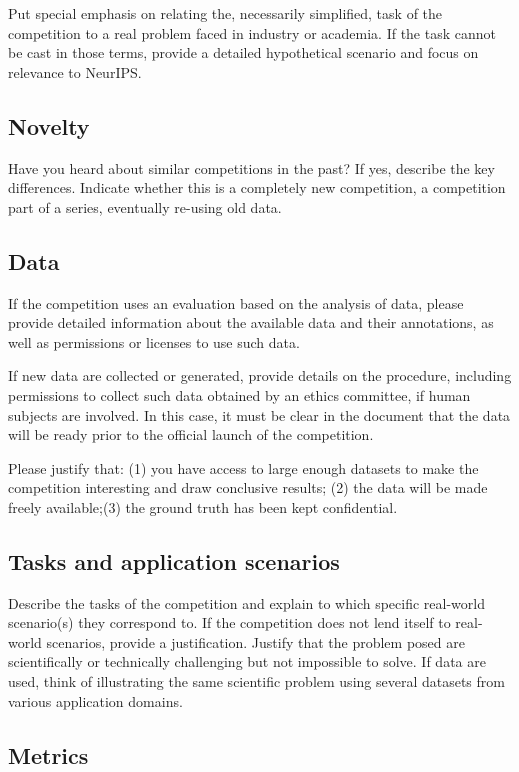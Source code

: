 \documentclass[11pt, oneside]{article}
\begin{document}
Put special emphasis on relating the, necessarily simplified, task of the competition to a real problem faced in industry or academia. If the task cannot be cast in those terms, provide a detailed hypothetical scenario and focus on relevance to NeurIPS.


\subsection{Novelty}

Have you heard about similar competitions in the past? If yes, describe the key differences.
Indicate whether this is a completely new competition, a competition part of a series, eventually re-using old data.

\subsection{Data}

If the competition uses an evaluation based on the analysis of data,
please provide detailed information about the available data and
their annotations, as well as permissions or licenses to use such data.

If new data are collected or generated, provide details on the procedure, including permissions to collect such data obtained by an ethics committee, if human subjects are involved. In this case, it must be clear in the document that the data will be ready prior to the official launch of the
competition.

Please justify that: (1) you have access to large
enough datasets to make the competition interesting and draw
conclusive
 results; (2) the data will be made freely available;(3) the ground truth has been kept confidential.

\subsection{Tasks and application scenarios}

Describe the tasks of the competition and explain to which specific real-world scenario(s) they correspond to. If the competition does not lend itself
to real-world scenarios, provide a justification. Justify that the problem posed are scientifically or technically challenging but not impossible to
solve. If data are used, think of illustrating the same scientific problem using several datasets from various application domains.


\subsection{Metrics}
\end{document}
